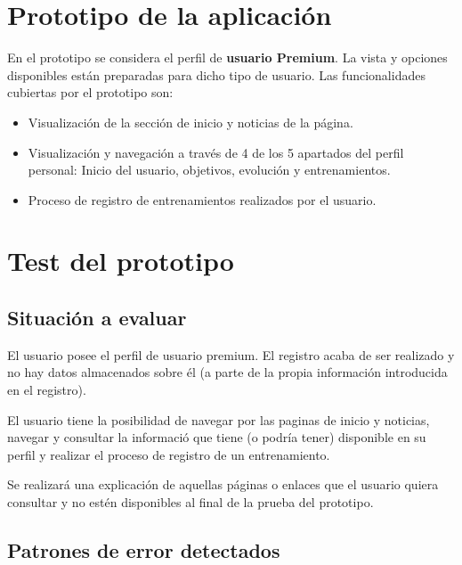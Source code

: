 \documentclass[a4paper]{article}
\begin{document}
\section{Prototipo de la aplicación}

En el prototipo se considera el perfil de \textbf{usuario Premium}. La vista y opciones disponibles están preparadas para dicho tipo de usuario. Las funcionalidades cubiertas por el prototipo son:

	\begin{itemize}
		\item	Visualización de la sección de inicio y noticias de la página.
		\item	Visualización y navegación a través de 4 de los 5 apartados del perfil personal: Inicio del usuario, objetivos, evolución y  entrenamientos.
		\item	Proceso de registro de entrenamientos realizados por el usuario.
	\end{itemize}
	

\section{Test del prototipo}

\subsection{Situación a evaluar}

El usuario posee el perfil de usuario premium. El registro acaba de ser realizado y no hay datos almacenados sobre él (a parte de la propia información introducida en el registro).

El usuario tiene la posibilidad de navegar por las paginas de inicio y noticias, navegar y consultar la informació que tiene (o podría tener) disponible en su perfil y realizar el proceso de registro de un entrenamiento.

Se realizará una explicación de aquellas páginas o enlaces que el usuario quiera consultar y no estén disponibles al final de la prueba del prototipo.

\subsection{Patrones de error detectados}
\end{document}
